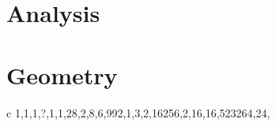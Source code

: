 \documentclass[11pt,oneside,%
]{memoir}
\newenvironment{eqna}{\begin{IEEEeqnarray}{c}}{\end{IEEEeqnarray}\ignorespacesafterend}
\theoremstyle{definition}
\begin{document}







    

\section{Analysis}




\section{Geometry}

\begin{eqna}
    1,1,1,?,1,1,28,2,8,6,992,1,3,2,16256,2,16,16,523264,24,\dotsc\nonumber
\end{eqna}
\end{document}

